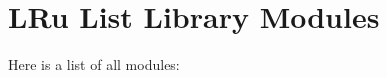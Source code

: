 \section{LRu List Library Modules}
Here is a list of all modules:\begin{CompactList}
\item {}
\end{CompactList}
